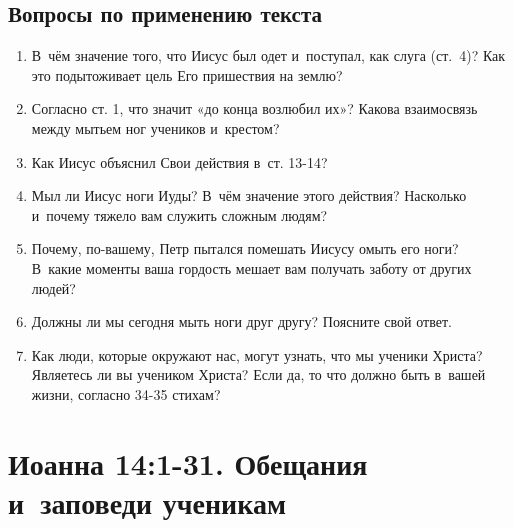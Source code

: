 \documentclass[a4paper,12pt]{article}
\begin{document}
\subsection*{Вопросы по применению текста} 
\begin{enumerate}
    \item В~чём значение того, что Иисус был одет и~поступал, как слуга (ст.~4)? Как это подытоживает цель Его пришествия на землю?
    
    \myline
    
    \myline
    \item Согласно ст. 1, что значит «до конца возлюбил их»? Какова взаимосвязь между мытьем ног учеников и~крестом? 
    
    \myline
    
    \myline
    \item Как Иисус объяснил Свои действия в~ст. 13-14? 
    
    \myline
    
    \myline
    \item Мыл ли Иисус ноги Иуды? В~чём значение этого действия? Насколько и~почему тяжело вам служить сложным людям? 
    
    \myline
    
    \myline
    \item Почему, по-вашему, Петр пытался помешать Иисусу омыть его ноги? В~какие моменты ваша гордость мешает вам получать заботу от других людей?
    
    \myline
    
    \myline
    \item Должны ли мы сегодня мыть ноги друг другу? Поясните свой ответ. 
    
    \myline
    
    \myline
    \item Как люди, которые окружают нас, могут узнать, что мы ученики Христа? Являетесь ли вы учеником Христа? Если да, то что должно быть в~вашей жизни, согласно 34-35 стихам? 
    
    \myline
    
    \myline
\end{enumerate}



\section{Иоанна 14:1-31. Обещания и~заповеди ученикам}
\end{document}
